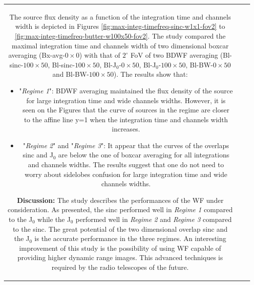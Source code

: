 \documentclass[useAMS,usenatbib]{mn2e}
\begin{document}
\begin{tabular}{*3{c}}
The source flux density as a function of the integration time and channels width is depicted in Figures 
\ref{fig:max-integ-timefreq-sinc-w1x1-fov2} to 
 \ref{fig:max-integ-timefreq-butter-w100x50-fov2}. The study compared the maximal integration time and channels width of two dimensional 
boxcar  averaging (Bx-avg-$0\times 0$) 
with that of  $2^{\circ}$ FoV of two BDWF averaging (Bl-sinc-$100\times 50$, Bl-sinc-$100\times 50$, Bl-J$_0$-$0\times 50$, 
Bl-J$_0$-$100\times 50$, Bl-BW-$0\times 50$ and Bl-BW-$100\times 50$). 
The results show that:
\begin{itemize}
 \item "\textit{Regime 1}": BDWF averaging maintained the flux density of the source for large integration time and wide channels widths. 
However, 
it is seen on the Figures that the curve of sources in the regime are closer to the affine line y=1 when the integration time and 
channels width increases.
 \item  "\textit{Regime 2}" and "\textit{Regime 3}":  It appear that the curves of the overlaps sinc and J$_0$ are below the one of boxcar 
averaging for all integrations and channels widths. The 
results suggest that one do not need to worry about sidelobes confusion for large integration time and wide channels widths. 
\end{itemize}

\hspace{-0.64cm}\textbf{Discussion:}
The study describes the performances of the WF under consideration. As presented, the sinc performed well in \textit{Regime 1} compared 
to the J$_0$ while the J$_0$ performed well in \textit{Regime 2} and \textit{Regime 3} compared to the sinc. The great potential  of the 
two dimensional overlap sinc and the J$_0$ is the accurate performance in the three regimes. An interesting improvement of this study is 
the possibility of using WF capable of providing higher dynamic range images. This advanced techniques 
is required by the radio telescopes of the future.

\end{tabular}
\end{document}
